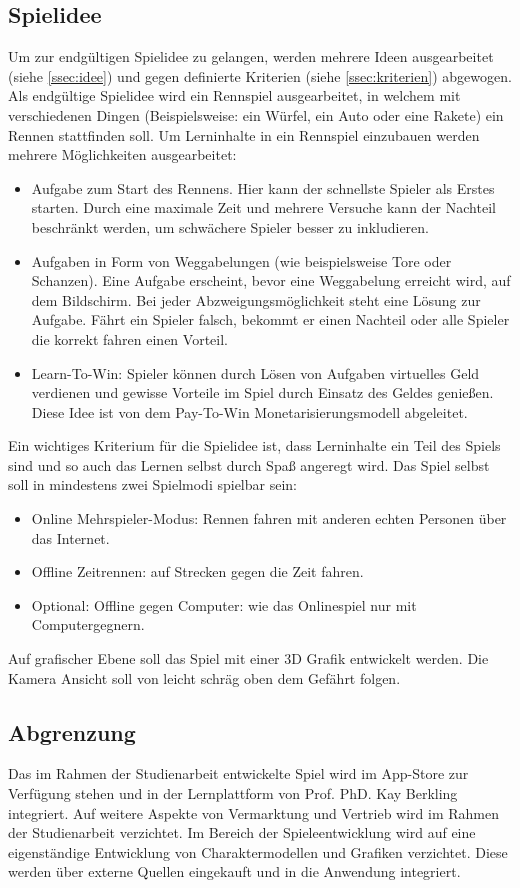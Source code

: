 \subsection{Spielidee}\label{ssec:spielidee}
	Um zur endgültigen Spielidee zu gelangen, werden mehrere Ideen ausgearbeitet (siehe \ref{ssec:idee}) und gegen definierte Kriterien (siehe \ref{ssec:kriterien}) abgewogen.
	Als endgültige Spielidee wird ein Rennspiel ausgearbeitet, in welchem mit verschiedenen Dingen (Beispielsweise: ein Würfel, ein Auto oder eine Rakete) ein Rennen stattfinden soll. Um Lerninhalte in ein Rennspiel einzubauen werden mehrere Möglichkeiten ausgearbeitet:
	\begin{itemize}
		\item{ Aufgabe zum Start des Rennens. Hier kann der schnellste Spieler als Erstes starten. Durch eine maximale Zeit und mehrere Versuche kann der Nachteil beschränkt werden, um schwächere Spieler besser zu inkludieren. }
		\item{ Aufgaben in Form von Weggabelungen (wie beispielsweise Tore oder Schanzen). Eine Aufgabe erscheint, bevor eine Weggabelung erreicht wird, auf dem Bildschirm. Bei jeder Abzweigungsmöglichkeit steht eine Lösung zur Aufgabe. Fährt ein Spieler falsch, bekommt er einen Nachteil oder alle Spieler die korrekt fahren einen Vorteil. }
		\item{ Learn-To-Win: Spieler können durch Lösen von Aufgaben virtuelles Geld verdienen und gewisse Vorteile im Spiel durch Einsatz des Geldes genießen. Diese Idee ist von dem Pay-To-Win Monetarisierungsmodell abgeleitet. }
	\end{itemize}
	Ein wichtiges Kriterium für die Spielidee ist, dass Lerninhalte ein Teil des Spiels sind und so auch das Lernen selbst durch Spaß angeregt wird.
	Das Spiel selbst soll in mindestens zwei Spielmodi spielbar sein:
	\begin{itemize}
		\item{ Online Mehrspieler-Modus: Rennen fahren mit anderen echten Personen über das Internet. }
		\item{ Offline Zeitrennen: auf Strecken gegen die Zeit fahren. }
		\item{ Optional: Offline gegen Computer: wie das Onlinespiel nur mit Computergegnern. }
	\end{itemize}
	Auf grafischer Ebene soll das Spiel mit einer 3D Grafik entwickelt werden. Die Kamera Ansicht soll von leicht schräg oben dem Gefährt folgen.

\subsection{Abgrenzung}
	Das im Rahmen der Studienarbeit entwickelte Spiel wird im App-Store zur Verfügung stehen und in der Lernplattform von Prof. PhD. Kay Berkling integriert. Auf weitere Aspekte von Vermarktung und Vertrieb wird im Rahmen der Studienarbeit verzichtet.
	Im Bereich der Spieleentwicklung wird auf eine eigenständige Entwicklung von Charaktermodellen und Grafiken verzichtet. Diese werden über externe Quellen eingekauft und in die Anwendung integriert.

